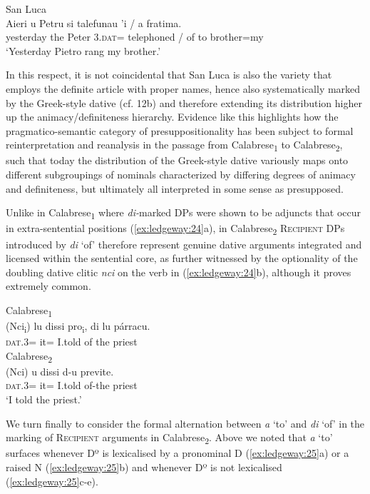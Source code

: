 \documentclass[output=paper,modfonts,nonflat,colorlinks,citecolor=brown]{langsci/langscibook}
\begin{document}
\ea\label{ex:ledgeway:23}
  San Luca\\
\gll Aieri  u  Petru  si  talefunau  ’i  /  a  fratima.\\
  yesterday  the  Peter  3.\textsc{dat}=  telephoned  / of to brother=my\\
    \glt `Yesterday Pietro rang my brother.'
    \z 

In this respect, it is not coincidental that San Luca is also the variety that employs the definite article with proper names, hence also systematically marked by the Greek-style dative (cf. 12b) and therefore extending its distribution higher up the animacy/definiteness hierarchy. Evidence like this highlights how the pragmatico-semantic category of presuppositionality has been subject to formal reinterpretation and reanalysis in the passage from Calabrese\textsubscript{1} to Calabrese\textsubscript{2}, such that today the distribution of the Greek-style dative variously maps onto different subgroupings of nominals characterized by differing degrees of animacy and definiteness, but ultimately all interpreted in some sense as presupposed.

Unlike in Calabrese\textsubscript{1} where \textit{di-}marked DPs were shown to be adjuncts that occur in extra-sentential positions (\ref{ex:ledgeway:24}a), in Calabrese\textsubscript{2} \textsc{Recipient} DPs introduced by \textit{di} ‘of’ therefore represent genuine dative arguments integrated and licensed within the sentential core, as further witnessed by the optionality of the doubling dative clitic \textit{nci} on the verb in (\ref{ex:ledgeway:24}b), although it proves extremely common.

\ea\label{ex:ledgeway:24}
\ea  Calabrese\textsubscript{1}\\
	\gll (Nci\textsubscript{i}) lu dissi pro\textsubscript{i}, di lu párracu.\\
       \textsc{dat}.3= it= I.told { } of the priest\\

\ex Calabrese\textsubscript{2}\\
    \gll (Nci)  u  dissi  d-u  previte.\\
    \textsc{dat}.3=  it=  I.told  of-the  priest\\
    \glt `I told the priest.'
    \z
    \z

We turn finally to consider the formal alternation between \textit{a} ‘to’ and \textit{di} ‘of’ in the marking of \textsc{Recipient} arguments in Calabrese\textsubscript{2}. Above we noted that \textit{a} ‘to’ surfaces whenever Dº is lexicalised by a pronominal D (\ref{ex:ledgeway:25}a) or a raised N (\ref{ex:ledgeway:25}b) and whenever Dº is not lexicalised (\ref{ex:ledgeway:25}c-e).
\end{document}
